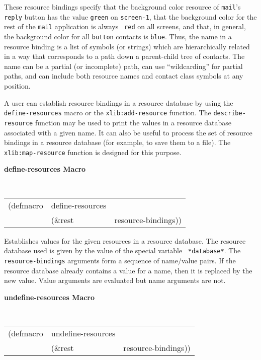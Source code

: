 \documentclass[twoside]{book}
\begin{document}
\begin{sloppy}
These resource bindings specify that the background color resource of
{\tt mail}'s {\tt reply} button has the value {\tt green} on {\tt screen-1}, that
the background color for the rest of the {\tt mail} application is always {\tt
red} on all screens, and that, in general, the background color for all {\tt button}
contacts is {\tt blue}. Thus, the name in a resource binding is a list
of symbols (or strings) which are hierarchically related in a way that
corresponds to
a path down a parent-child tree of contacts. The name can be a partial
(or incomplete) path, can use ``wildcarding'' for partial paths, and can include both
resource names and contact class symbols at any position.

A user can establish 
resource bindings in a resource database by using the {\tt define-resources}
macro or the {\tt xlib:add-resource} function.
The {\tt describe-resource} function may be used to print the values in a
resource database associated with a given name.
It can also be useful to process the set of resource bindings in a resource
database (for example, to save them to a file). The
{\tt xlib:map-resource} function is designed for this purpose.


{\large {\bf define-resources \hfill Macro}} 
\begin{flushright} \parbox[t]{6.125in}{
\tt
\begin{tabular}{lll}
\raggedright
(defmacro & define-resources & \\ 
& (\&rest & resource-bindings))
\end{tabular}
\rm

}\end{flushright}

\begin{flushright} \parbox[t]{6.125in}{
Establishes values for the given resources in a resource database. 
The resource database used is given by the value of the special variable {\tt
*database*}.
The {\tt resource-bindings} arguments form a sequence of name/value pairs.
If the resource database already contains a value for a name, then it
is replaced by the new value. Value arguments are evaluated but name
arguments are not. 
}\end{flushright}


{\large {\bf undefine-resources \hfill Macro}} 
\begin{flushright} \parbox[t]{6.125in}{
\tt
\begin{tabular}{lll}
\raggedright
(defmacro & undefine-resources & \\ 
& (\&rest & resource-bindings))
\end{tabular}
\rm

}
\end{flushright}
\end{sloppy}
\end{document}
